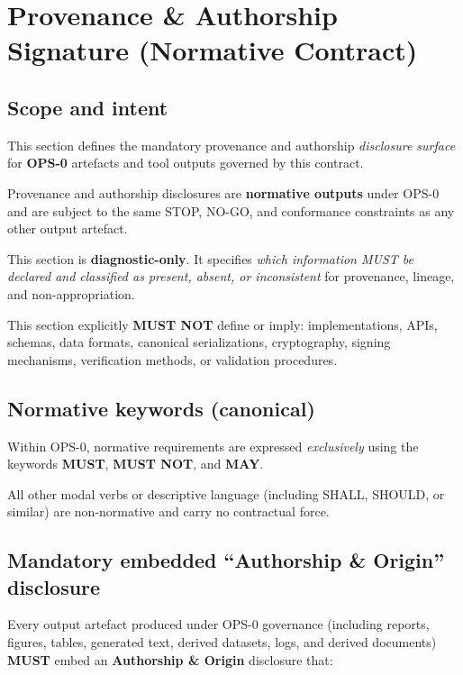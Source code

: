 ﻿\section{Provenance \& Authorship Signature (Normative Contract)}
\label{sec:ops0_provenance_signature}

\subsection{Scope and intent}
This section defines the mandatory provenance and authorship
\emph{disclosure surface} for \textbf{OPS-0} artefacts and tool outputs
governed by this contract.

Provenance and authorship disclosures are
\textbf{normative outputs} under OPS-0 and
are subject to the same STOP, NO-GO,
and conformance constraints
as any other output artefact.

This section is \textbf{diagnostic-only}.
It specifies \emph{which information MUST be declared and classified
as present, absent, or inconsistent} for provenance, lineage,
and non-appropriation.

This section explicitly \textbf{MUST NOT} define or imply:
implementations, APIs, schemas, data formats,
canonical serializations, cryptography,
signing mechanisms, verification methods,
or validation procedures.

\subsection{Normative keywords (canonical)}
Within OPS-0, normative requirements are expressed
\emph{exclusively} using the keywords
\textbf{MUST}, \textbf{MUST NOT}, and \textbf{MAY}.

All other modal verbs or descriptive language
(including SHALL, SHOULD, or similar)
are non-normative and carry no contractual force.

\subsection{Mandatory embedded ``Authorship \& Origin'' disclosure}
Every output artefact produced under OPS-0 governance
(including reports, figures, tables, generated text,
derived datasets, logs, and derived documents)
\textbf{MUST} embed an \textbf{Authorship \& Origin} disclosure that:

